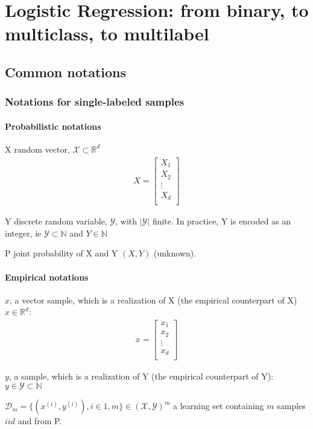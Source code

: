 \chapter{Logistic Regression: from binary, to multiclass, to multilabel} %
\label{cha:multilabel_classification}


\section*{Common notations}


\subsection*{Notations for single-labeled samples}

\subsubsection*{Probabilistic notations}

\begin{outline}
\1 X random vector, $\mathcal{X} \subset \mathbb{R}^d$
\begin{align}
	X = \left[
	\begin{array}{cccc}
		X_{1} \\
		X_{2} \\
		\vdots\\
		X_{d} \\
	\end{array}\right]
\end{align}

\1 Y discrete random variable, $\mathcal{Y} $, with $|\mathcal{Y}|$ finite. In practice, Y is encoded as an integer, ie $\mathcal{Y} \subset \mathbb{N} $ and $Y \in \mathbb{N}$

\1 P joint probability of X and Y $(X,Y)$ (unknown).
\end{outline}

\subsubsection*{Empirical notations}

\begin{outline}
\1 $x$, a vector sample, which is a realization of X (the empirical counterpart of X) $x \in \mathbb{R}^d$:
\begin{align}
	x = \left[
	\begin{array}{cccc}
		x_{1} \\
		x_{2} \\
		\vdots\\
		x_{d} \\
	\end{array}\right]
\end{align}

\1 $y$, a sample, which is a realization of Y (the empirical counterpart of Y): $y \in \mathcal{Y} \subset \mathbb{N}$

\1 $ \mathcal{D}_m = \{(x^{(i)}, y^{(i)}), i \in 1,m\} \in (\mathcal{X},\mathcal{Y})^m$ a learning set containing $m$ samples $iid$ and from P.\\
\end{outline}

